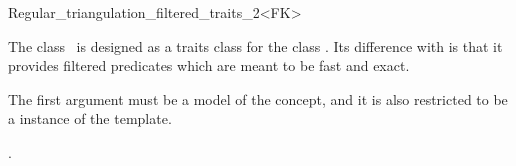 

\begin{ccRefClass}{Regular_triangulation_filtered_traits_2<FK>}

\ccDefinition
  
The class \ccRefName\ is designed as a traits class for the
class . 
Its difference with  is that it
provides filtered predicates which are meant to be fast and exact.

The first argument  must be a model of the  concept, and
it is also restricted to be a instance of the  template.


\ccIsModel
{}


\ccSeeAlso

.

\end{ccRefClass}
